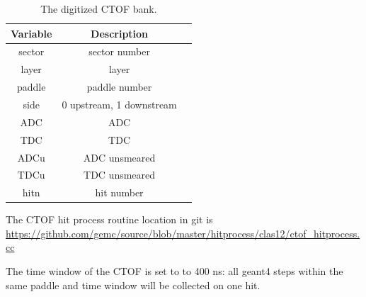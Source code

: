 \begin{table}[h]
	\begin{center}
		\begin{tabular}{| c | c | c |}
			\hline \hline
			Variable         & Description   \\
			\hline
              sector  &                             sector number   \\
               layer  &                                     layer   \\
              paddle  &                             paddle number   \\
                side  &                  0 upstream, 1 downstream   \\
                 ADC  &                                       ADC   \\
                 TDC  &                                       TDC   \\
                ADCu  &                             ADC unsmeared   \\
                TDCu  &                             TDC unsmeared   \\
                hitn  &                                hit number   \\
			\hline \hline
		\end{tabular}
	\end{center}
	\caption{The digitized CTOF bank.}\label{tab:ctofBank}
\end{table}

The CTOF hit process routine location in git is \url{https://github.com/gemc/source/blob/master/hitprocess/clas12/ctof_hitprocess.cc}

The time window  of the CTOF is set to to 400 ns: all geant4 steps within the same paddle and time window will be collected on one hit.
